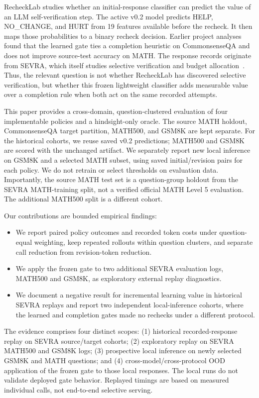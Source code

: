 \documentclass[conference]{IEEEtran}
\begin{document}
RecheckLab studies whether an initial-response classifier can predict the value of an LLM self-verification step. The active v0.2 model predicts HELP, NO\_CHANGE, and HURT from 19 features available before the recheck. It then maps those probabilities to a binary recheck decision. Earlier project analyses found that the learned gate ties a completion heuristic on CommonsenseQA and does not improve source-test accuracy on MATH. The response records originate from SEVRA, which itself studies selective verification and budget allocation~\cite{dip2026sevra}. Thus, the relevant question is not whether RecheckLab has discovered selective verification, but whether this frozen lightweight classifier adds measurable value over a completion rule when both act on the same recorded attempts.

This paper provides a cross-domain, question-clustered evaluation of four implementable policies and a hindsight-only oracle. The source MATH holdout, CommonsenseQA target partition, MATH500, and GSM8K are kept separate. For the historical cohorts, we reuse saved v0.2 predictions; MATH500 and GSM8K are scored with the unchanged artifact. We separately report new local inference on GSM8K and a selected MATH subset, using saved initial/revision pairs for each policy. We do not retrain or select thresholds on evaluation data. Importantly, the source MATH test set is a question-group holdout from the SEVRA MATH-training split, not a verified official MATH Level 5 evaluation. The additional MATH500 split is a different cohort.

Our contributions are bounded empirical findings:
\begin{itemize}
  \item We report paired policy outcomes and recorded token costs under question-equal weighting, keep repeated rollouts within question clusters, and separate call reduction from revision-token reduction.
  \item We apply the frozen gate to two additional SEVRA evaluation logs, MATH500 and GSM8K, as exploratory external replay diagnostics.
  \item We document a negative result for incremental learning value in historical SEVRA replays and report two independent local-inference cohorts, where the learned and completion gates made no rechecks under a different protocol.
\end{itemize}

The evidence comprises four distinct scopes: (1) historical recorded-response replay on SEVRA source/target cohorts; (2) exploratory replay on SEVRA MATH500 and GSM8K logs; (3) prospective local inference on newly selected GSM8K and MATH questions; and (4) cross-model/cross-protocol OOD application of the frozen gate to those local responses. The local runs do not validate deployed gate behavior. Replayed timings are based on measured individual calls, not end-to-end selective serving.
\end{document}
